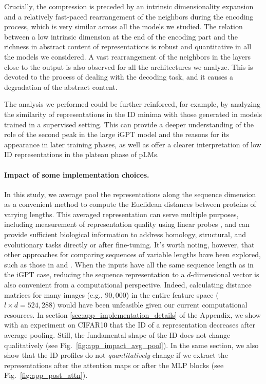 \documentclass{article}
\begin{document}
Crucially, the compression is preceded by an intrinsic dimensionality expansion and a relatively fast-paced rearrangement of the neighbors during the encoding process, which is very similar across all the models we studied.  
%
The relation between a low intrinsic dimension at the end of the encoding part and the richness in abstract content of representations is robust and quantitative in all the models we considered. 
%
A vast rearrangement of the neighbors in the layers close to the output is also observed for all the architectures we analyze. This is devoted to the process of dealing with the decoding task, and it causes a degradation of the abstract content.


The analysis we performed could be further reinforced, for example, by analyzing the similarity of representations in the ID minima with those generated in models trained in a supervised setting. 
%
This can provide a deeper understanding of the role of the second peak in the large iGPT model and the reasons for its appearance in later training phases, as well as offer a clearer interpretation of low ID representations in the plateau phase of pLMs.


\paragraph{Impact of some implementation choices.}
In this study, we average pool the representations along the sequence dimension as a convenient method to compute the Euclidean distances between proteins of varying lengths. 
%
This averaged representation can serve multiple purposes, including measurement of representation quality using linear probes \cite{igpt}, and can provide sufficient biological information to address homology, structural, and evolutionary tasks directly or after fine-tuning.
%
It's worth noting, however, that other approaches for comparing sequences of variable lengths have been explored, such as those in \cite{meaningful-reps} and \cite{cheng2023bridging}.
%
When the inputs have all the same sequence length as in the iGPT case, reducing the sequence representation to a $d$-dimensional vector is also convenient from a computational perspective.  
%
Indeed, calculating distance matrices for many images (e.g., $90,000$) in the entire feature space ($l \times d = 524,288$) would have been unfeasible given our current computational resources.
% 
In section \ref{sec:app_implementation_details} of the Appendix, we show with an experiment on CIFAR10 that the ID of a representation decreases after average pooling.
Still, the fundamental shape of the ID does not change qualitatively (see Fig.~\ref{fig:app_impact_avg_pool}).
%
In the same section, we also show that the ID profiles do not \emph{quantitatively} change if we extract the representations after the attention maps or after the MLP blocks (see Fig.~\ref{fig:app_post_attn}).
\end{document}
